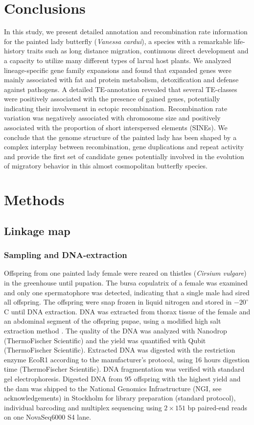 \documentclass[twocolumn]{bmcart}%
\begin{document}
\section*{Conclusions}
In this study, we present detailed annotation and recombination rate information for the painted lady butterfly (\textit{Vanessa cardui}), a species with a remarkable life-history traits such as long distance migration, continuous direct development and a capacity to utilize many different types of larval host plants. We analyzed lineage-specific gene family expansions and found that expanded genes were mainly associated with fat and protein metabolism, detoxification and defense against pathogens. A detailed TE-annotation revealed that several TE-classes were positively associated with the presence of gained genes, potentially indicating their involvement in ectopic recombination. Recombination rate variation was negatively associated with chromosome size and positively associated with the proportion of short interspersed elements (SINEs). We conclude that the genome structure of the painted lady has been shaped by a complex interplay between recombination, gene duplications and repeat activity and provide the first set of candidate genes potentially involved in the evolution of migratory behavior in this almost cosmopolitan butterfly species.

\section*{Methods}
\subsection*{Linkage map}
\subsubsection*{Sampling and DNA-extraction}
Offspring from one painted lady female were reared on thistles (\textit{Cirsium vulgare}) in the greenhouse until pupation. The bursa copulatrix of a female was examined and only one spermatophore was detected, indicating that a single male had sired all offspring. The offspring were snap frozen in liquid nitrogen and stored in $-20^\circ$C until DNA extraction. DNA was extracted from thorax tissue of the female and an abdominal segment of the offspring pupae, using a modified high salt extraction method \cite{aljanabiUniversalRapidSaltextraction1997}. The quality of the DNA was analyzed with Nanodrop (ThermoFischer Scientific) and the yield was quantified with Qubit (ThermoFischer Scientific). Extracted DNA was digested with the restriction enzyme EcoR1 according to the manufacturer's protocol, using 16 hours digestion time (ThermoFischer Scientific). DNA fragmentation was verified with standard gel electrophoresis. Digested DNA from 95 offspring with the highest yield and the dam was shipped to the National Genomics Infrastructure (NGI, see acknowledgements) in Stockholm for library preparation (standard protocol), individual barcoding and multiplex sequencing using $2\times151$ bp paired-end reads on one NovaSeq6000 S4 lane.
\end{document}
